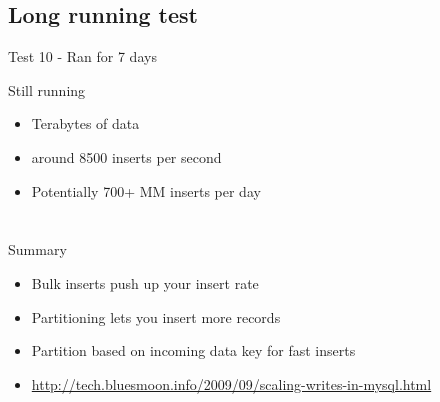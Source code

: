 \documentclass{beamer}
\begin{document}
\subsection{Long running test}
\begin{frame}{Test 10 - Ran for 7 days}
\end{frame}

\begin{frame}{Still running}
  \begin{block}{}
  \begin{itemize}
  \item Terabytes of data
  \item around 8500 inserts per second
  \item Potentially 700+ MM inserts per day
  \end{itemize}
  \end{block}
\end{frame}


\section{}
\subsection{}
\begin{frame}{Summary}
  \begin{block}{}
  \begin{itemize}
  \item Bulk inserts push up your insert rate
  \item Partitioning lets you insert more records
  \item Partition based on incoming data key for fast inserts
  \item \href{http://tech.bluesmoon.info/2009/09/scaling-writes-in-mysql.html}{\small{http://tech.bluesmoon.info/2009/09/scaling-writes-in-mysql.html}}
  \end{itemize}
  \end{block}
\end{frame}
\end{document}
